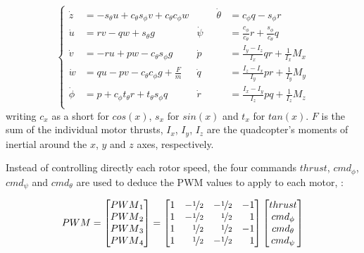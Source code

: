 \documentclass[anonymous=true,format=sigconf, screen=true, review=false]{acmart}
\begin{document}
\begin{equation}
\label{eq:dynamic}
\left\{
\begin{alignedat}{2}
\dot{z} &= -s_\theta u + c_\theta s_\phi v + c_\theta c_\phi w &\qquad \dot{\theta} &= c_\phi q  - s_\phi r \\
\dot{u} &= rv - qw + s_\theta g & \dot{\psi}   &= \tfrac{c_\phi}{c_\theta} r + \tfrac{s_\phi}{c_\theta} q \\
\dot{v} &= -ru + pw - c_\theta s_\phi g & \dot{p} &= \tfrac{I_y - I_z}{I_x} qr + \tfrac{1}{I_x} M_x \\
\dot{w} &= qu - pv - c_\theta c_\phi g + \tfrac{F}{m} & \dot{q} &= \tfrac{I_z - I_x}{I_y} pr + \tfrac{1}{I_y} M_y \\
\dot{\phi}   &= p + c_\phi t_\theta r  + t_\theta s_\phi q & \dot{r} &= \tfrac{I_x - I_y}{I_z} pq + \tfrac{1}{I_z} M_z \\
\end{alignedat}
\right.
\end{equation} 
\noindent
writing $c_{x}$ as a short for $cos(x)$, $s_{x}$ for $sin(x)$ and $t_{x}$ for $tan(x)$. 
$F$ is the sum of the individual motor thrusts, $I_x$, $I_y$, $I_z$ are the quadcopter's moments of inertial around the $x$, $y$ and $z$ axes, respectively. 

Instead of controlling directly each rotor speed, the four commands $thrust$, $cmd_{\phi}$, $cmd_{\psi}$ and $cmd_{\theta}$ are used to deduce the PWM values to apply to each motor, : 

\begin{equation}
\label{eq:PWM}
PWM = 
\begin{bmatrix}
  {PWM}_1 \\
  {PWM}_2 \\
  {PWM}_3 \\
  {PWM}_4
\end{bmatrix} = 
\begin{bmatrix}
  1 & -\nicefrac{1}{2} & -\nicefrac{1}{2} & -1\\
  1 & -\nicefrac{1}{2} & \phantom{-}\nicefrac{1}{2} & \phantom{-}1\\
  1 & \phantom{-}\nicefrac{1}{2} & \phantom{-}\nicefrac{1}{2} & -1\\
  1 & \phantom{-}\nicefrac{1}{2} & -\nicefrac{1}{2} & \phantom{-}1\\
\end{bmatrix}
\begin{bmatrix}
thrust \\
cmd_\phi \\
cmd_\theta \\
cmd_\psi \\
\end{bmatrix}
\end{equation} \\
\end{document}
